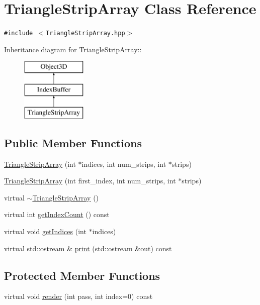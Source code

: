 \hypertarget{classm3g_1_1TriangleStripArray}{
\section{TriangleStripArray Class Reference}
\label{classm3g_1_1TriangleStripArray}
}
{\tt \#include $<$TriangleStripArray.hpp$>$}

Inheritance diagram for TriangleStripArray::\begin{figure}[H]
\begin{center}
\leavevmode
\includegraphics[height=3cm]{classm3g_1_1TriangleStripArray}
\end{center}
\end{figure}
\subsection*{Public Member Functions}
\begin{CompactItemize}
\item 
\hyperlink{classm3g_1_1TriangleStripArray_57d4e874819367084aeadb11593c4436}{TriangleStripArray} (int $\ast$indices, int num\_\-strips, int $\ast$strips)
\item 
\hyperlink{classm3g_1_1TriangleStripArray_d2ca9884a6ccf32da3cee977549b5ee0}{TriangleStripArray} (int first\_\-index, int num\_\-strips, int $\ast$strips)
\item 
virtual \hyperlink{classm3g_1_1TriangleStripArray_1cb3853bf79b7710d57044da818d2cde}{$\sim$TriangleStripArray} ()
\item 
virtual int \hyperlink{classm3g_1_1TriangleStripArray_fe9ae2993ebcdb93d5ff26d57c81b73e}{getIndexCount} () const 
\item 
virtual void \hyperlink{classm3g_1_1TriangleStripArray_650953afac45099025a524ab160b911f}{getIndices} (int $\ast$indices)
\item 
virtual std::ostream \& \hyperlink{classm3g_1_1TriangleStripArray_6fea17fa1532df3794f8cb39cb4f911f}{print} (std::ostream \&out) const 
\end{CompactItemize}
\subsection*{Protected Member Functions}
\begin{CompactItemize}
\item 
virtual void \hyperlink{classm3g_1_1TriangleStripArray_1efcb1973989d9963d5bd6d03065d389}{render} (int pass, int index=0) const 
\end{CompactItemize}
